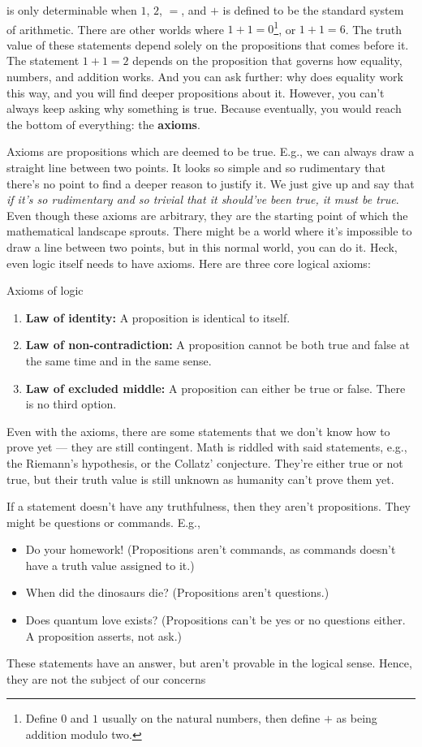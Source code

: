 is only determinable when \(1\), \(2\), \(=\), and \(+\) is defined to be the standard system of arithmetic. There are other worlds where \(1 + 1 = 0\)\footnote{Define \(0\) and \(1\) usually on the natural numbers, then define \(+\) as being addition modulo two.}, or \(1 + 1 = 6\). The truth value of these statements depend solely on the propositions that comes before it. The statement \(1 + 1 = 2\) depends on the proposition that governs how equality, numbers, and addition works. And you can ask further: why does equality work this way, and you will find deeper propositions about it. However, you can't always keep asking why something is true. Because eventually, you would reach the bottom of everything: the \textbf{axioms}.

Axioms are propositions which are deemed to be true. E.g., we can always draw a straight line between two points. It looks so simple and so rudimentary that there's no point to find a deeper reason to justify it. We just give up and say that \emph{if it's so rudimentary and so trivial that it should've been true, it must be true}. Even though these axioms are arbitrary, they are the starting point of which the mathematical landscape sprouts. There might be a world where it's impossible to draw a line between two points, but in this normal world, you can do it. Heck, even logic itself needs to have axioms. Here are three core logical axioms:

\begin{axiom}{Axioms of logic}{}
  \begin{enumerate}[noitemsep]
    \item \textbf{Law of identity:} A proposition is identical to itself.
    \item \textbf{Law of non-contradiction:} A proposition cannot be both true and false at the same time and in the same sense.
    \item \textbf{Law of excluded middle:} A proposition can either be true or false. There is no third option.
  \end{enumerate}
\end{axiom}

Even with the axioms, there are some statements that we don't know how to prove yet --- they are still contingent. Math is riddled with said statements, e.g., the Riemann's hypothesis, or the Collatz' conjecture. They're either true or not true, but their truth value is still unknown as humanity can't prove them yet.

If a statement doesn't have any truthfulness, then they aren't propositions. They might be questions or commands. E.g.,
\begin{itemize}[noitemsep]
  \item Do your homework! (Propositions aren't commands, as commands doesn't have a truth value assigned to it.)
  \item When did the dinosaurs die? (Propositions aren't questions.)
  \item Does quantum love exists? (Propositions can't be yes or no questions either. A proposition asserts, not ask.)
\end{itemize}
These statements have an answer, but aren't provable in the logical sense. Hence, they are not the subject of our concerns


